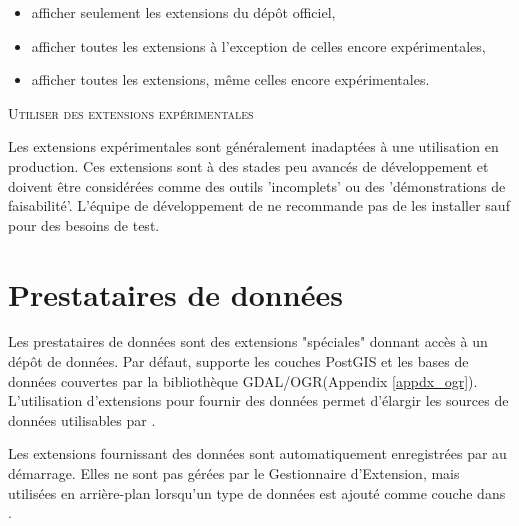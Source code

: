 \begin{itemize}[label=--]
\item afficher seulement les extensions du dépôt officiel,
\item afficher toutes les extensions à l'exception de celles encore expérimentales,
\item afficher toutes les extensions, même celles encore expérimentales.
\end{itemize}

\begin{Tip}
 \caption{\textsc{Utiliser des extensions expérimentales}}

Les extensions expérimentales sont généralement inadaptées à une utilisation en production. Ces extensions sont à des stades peu avancés de développement et doivent être considérées comme des outils 'incomplets' ou des 'démonstrations de faisabilité'. L'équipe de développement de \qg ne recommande pas de les installer sauf pour des besoins de test.
\end{Tip}


\section{Prestataires de données}


Les prestataires de données sont des extensions "spéciales" donnant accès à un dépôt de données.
Par défaut, \qg supporte les couches PostGIS et les bases de données couvertes par la bibliothèque GDAL/OGR(Appendix \ref{appdx_ogr}).
L'utilisation d'extensions pour fournir des données permet d'élargir les sources de données utilisables par \qg.

Les extensions fournissant des données sont automatiquement enregistrées par \qg au démarrage.
Elles ne sont pas gérées par le Gestionnaire d'Extension, mais utilisées en arrière-plan lorsqu'un type de données est ajouté comme couche dans \qg.
